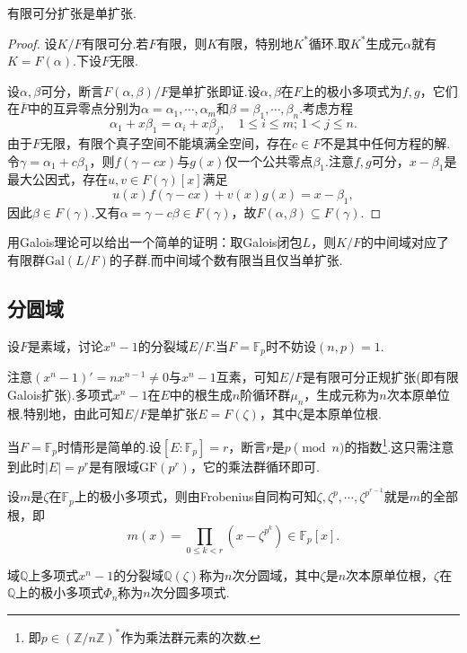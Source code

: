 \begin{thm}[(单扩张定理)]
    有限可分扩张是单扩张.
\end{thm}
\begin{proof}
    设$K/F$有限可分.若$F$有限，则$K$有限，特别地$K^*$循环.取$K^*$生成元$\alpha$就有$K=F(\alpha)$.下设$F$无限.

    设$\alpha,\beta$可分，断言$F(\alpha,\beta)/F$是单扩张即证.设$\alpha,\beta$在$F$上的极小多项式为$f,g$，它们在$\overline{F}$中的互异零点分别为$\alpha=\alpha_1,\cdots,\alpha_m$和$\beta=\beta_1,\cdots,\beta_n$.考虑方程
    \[
        \alpha_1+x\beta_1=\alpha_i+x\beta_j,\quad 1\le i\le m;\,1<j\le n.
    \]
    由于$F$无限，有限个真子空间不能填满全空间，存在$c\in F$不是其中任何方程的解.令$\gamma=\alpha_1+c\beta_1$，则$f(\gamma-cx)$与$g(x)$仅一个公共零点$\beta_1$.注意$f,g$可分，$x-\beta_1$是最大公因式，存在$u,v\in F(\gamma)[x]$满足
    \[
        u(x)f(\gamma-cx)+v(x)g(x)=x-\beta_1,
    \]
    因此$\beta\in F(\gamma)$.又有$\alpha=\gamma-c\beta\in F(\gamma)$，故$F(\alpha,\beta)\subseteq F(\gamma)$.
\end{proof}
\begin{remark}
    用Galois理论可以给出一个简单的证明：取Galois闭包$L$，则$K/F$的中间域对应了有限群$\mathrm{Gal}(L/F)$的子群.而中间域个数有限当且仅当单扩张.
\end{remark}

\subsection{分圆域}
设$F$是素域，讨论$x^n-1$的分裂域$E/F$.当$F=\mathbb{F}_p$时不妨设$(n,p)=1$.

注意$(x^n-1)'=nx^{n-1}\ne 0$与$x^n-1$互素，可知$E/F$是有限可分正规扩张(即有限Galois扩张).多项式$x^n-1$在$E$中的根生成$n$阶循环群$\mu_n$，生成元称为$n$次{\heiti 本原单位根}.特别地，由此可知$E/F$是单扩张$E=F(\zeta)$，其中$\zeta$是本原单位根.

\medskip 当$F=\mathbb{F}_p$时情形是简单的.设$[E:\mathbb{F}_p]=r$，断言$r$是$p\pmod n$的指数\footnote{即$p\in(\mathbb{Z}/n\mathbb{Z})^*$作为乘法群元素的次数.}.这只需注意到此时$|E|=p^r$是有限域$\mathrm{GF}(p^r)$，它的乘法群循环即可.

设$m$是$\zeta$在$\mathbb{F}_p$上的极小多项式，则由Frobenius自同构可知$\zeta,\zeta^p,\cdots,\zeta^{p^{r-1}}$就是$m$的全部根，即
\[
    m(x)=\prod_{0\le k<r}(x-\zeta^{p^k})\in\mathbb{F}_p[x].
\]

\begin{definition}
    域$\mathbb{Q}$上多项式$x^n-1$的分裂域$\mathbb{Q}(\zeta)$称为$n$次{\heiti 分圆域}，其中$\zeta$是$n$次本原单位根，$\zeta$在$\mathbb{Q}$上的极小多项式$\Phi_n$称为$n$次{\heiti 分圆多项式}.
\end{definition}

